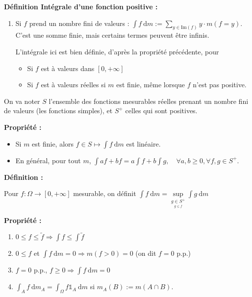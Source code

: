 \documentclass[10pt,a4paper,notitlepage ]{report}
\newcommand{\dd}{\ \mathrm d}
\newcommand{\1}{\mathds 1}
\renewcommand{\Im}{\mathrm{Im }}
\newenvironment{definition}[1][]{
	
	\textbf{Définition #1 : }
}
{}
\newcounter{th}
\newenvironment{propriete}[1][]{
	\begin{tcolorbox}
		\textbf{Propriété #1 : }
}
{\end{tcolorbox}}
\begin{document}
\begin{definition}[Intégrale d'une fonction positive]
	\begin{enumerate}
		\item Si $f$ prend un nombre fini de valeurs : $\int f\dd m := \underset{y\in \Im(f)}{\sum} y\cdot m(f=y)$. C'est une somme finie, mais certains termes peuvent être infinis.
		
		L'intégrale ici est bien définie, d'après la propriété précédente, pour
		\begin{itemize}
			\item Si $f$ est à valeurs dans $[0,+\infty]$
			\item Si $f$ est à valeurs réelles si $m$ est finie, même lorsque $f$ n'est pas positive.
		\end{itemize}
	\end{enumerate}
\end{definition}

On va noter $S$ l'ensemble des fonctions mesurables réelles prenant un nombre fini de valeurs (les fonctions simples), et $S^+$ celles qui sont positives.

\begin{propriete}
	\begin{itemize}
		\item Si $m$ est finie, alors $f\in S \mapsto \int f\dd m$ est linéaire.
		\item En général, pour tout $m$, $\int af + bf = a\int f + b\int g, \quad \forall a,b \ge 0, \forall f,g \in S^+$.
	\end{itemize}
\end{propriete}

\begin{definition}
	Pour $f: \Omega \rightarrow [0,+\infty]$ mesurable, on définit $\int f\dd m = \underset{\underset{g \le f}{g \in S^+}}{\sup} \int g \dd m$
\end{definition}

\begin{propriete}
	\begin{enumerate}
		\item $0 \le f \le \tilde f \Rightarrow \int f \le \int \tilde f$
		\item $0 \le f$ et $\int f \dd m = 0 \Rightarrow m(f>0) = 0$ (on dit $f = 0$ p.p.)
		\item $f=0$ p.p., $f\ge0 \Rightarrow \int f\dd m = 0$
		\item $\int_A f\dd m_A = \int_\Omega f\mathds 1_A \dd m$ si $m_A(B):=m(A\cap B)$.
	\end{enumerate}
\end{propriete}
\end{document}
